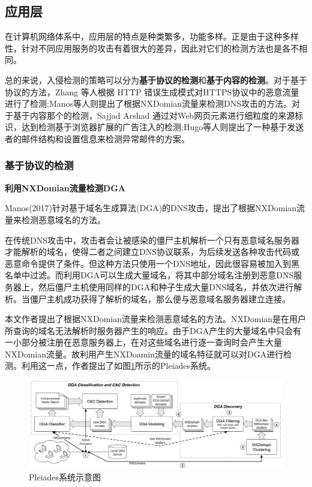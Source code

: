 \documentclass[12pt]{article} %
\begin{document}
\subsection{应用层}
\label{app}

在计算机网络体系中，应用层的特点是种类繁多，功能多样。正是由于这种多样性，针对不同应用服务的攻击有着很大的差异，因此对它们的检测方法也是各不相同。

总的来说，入侵检测的策略可以分为\textbf{基于协议的检测}和\textbf{基于内容的检测}。对于基于协议的方法，Zhang 等人根据 HTTP 错误生成模式对HTTPS协议中的恶意流量进行了检测;Manos等人则提出了根据NXDomian流量来检测DNS攻击的方法。对于基于内容那个的检测，Sajjad Arshad 通过对Web网页元素进行细粒度的来源标识，达到检测基于浏览器扩展的广告注入的检测;Hugo等人则提出了一种基于发送者的邮件结构和设置信息来检测异常邮件的方案。
\subsubsection{基于协议的检测}
\label{protocol}

\textbf{利用NXDomian流量检测DGA}

Manos(2017)\cite{Manos}针对基于域名生成算法(DGA)的DNS攻击，提出了根据NXDomian流量来检测恶意域名的方法。

在传统DNS攻击中，攻击者会让被感染的僵尸主机解析一个只有恶意域名服务器才能解析的域名，使得二者之间建立DNS协议联系，为后续发送各种攻击代码或恶意命令提供了条件。但这种方法只使用一个DNS地址，因此很容易被加入到黑名单中过滤。而利用DGA可以生成大量域名，将其中部分域名注册到恶意DNS服务器上，然后僵尸主机使用同样的DGA和种子生成大量DNS域名，并依次进行解析。当僵尸主机成功获得了解析的域名，那么便与恶意域名服务器建立连接。

本文作者提出了根据NXDomian流量来检测恶意域名的方法。NXDomian是在用户所查询的域名无法解析时服务器产生的响应。由于DGA产生的大量域名中只会有一小部分被注册在恶意服务器上，在对这些域名进行逐一查询时会产生大量NXDomian流量。故利用产生NXDoamin流量的域名特征就可以对DGA进行检测。利用这一点，作者提出了如图\ref{dga_pic}所示的Pleiades系统。

\begin{figure}
	\caption{Pleiades系统示意图}
	\label{dga_pic}
	\includegraphics[width = \linewidth]{./pics/dga}
\end{figure}
\end{document}
